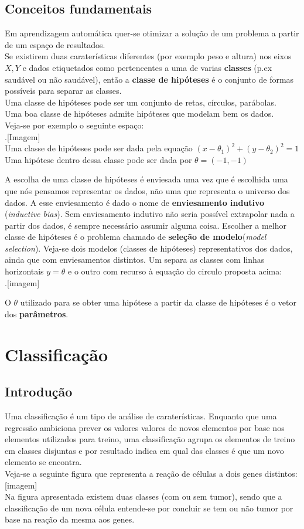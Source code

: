 \documentclass[]{report}
\begin{document}
\section{Conceitos fundamentais}
Em aprendizagem automática quer-se otimizar a solução de um problema a partir de um espaço de resultados.\\
Se existirem duas caraterísticas diferentes (por exemplo peso e altura) nos eixos $X,Y$ e dados etiquetados como pertencentes a uma de varias \textbf{classes} (p.ex saudável ou não saudável), então a \textbf{classe de hipóteses} é o conjunto de formas possíveis para separar as classes.\\
Uma classe de hipóteses pode ser um conjunto de retas, círculos, parábolas.\\
Uma boa classe de hipóteses admite hipóteses que modelam bem os dados.\\[0.2cm]
Veja-se por exemplo o seguinte espaço:\\
.[Imagem]\\[0.2cm]
Uma classe de hipóteses pode ser dada pela equação $(x-\theta_1)^2+(y-\theta_2)^2 = 1$\\
Uma hipótese dentro dessa classe pode ser dada por $\theta=(-1,-1)$\par
A escolha de uma classe de hipóteses é enviesada uma vez que é escolhida uma que nós pensamos representar os dados, não uma que representa o universo dos dados. A esse enviesamento é dado o nome de \textbf{enviesamento indutivo} (\textit{inductive bias}).
Sem enviesamento indutivo não seria possível extrapolar nada a partir dos dados, é sempre necessário assumir alguma coisa.
Escolher a melhor classe de hipóteses é o problema chamado de \textbf{seleção de modelo}(\textit{model selection}).
Veja-se dois modelos (classes de hipóteses) representativos dos dados, ainda que com enviesamentos distintos. Um separa as classes com linhas horizontais $y=\theta$ e o outro com recurso à equação do circulo proposta acima:\\
.[imagem]\par
O $\theta$ utilizado para se obter uma hipótese a partir da classe de hipóteses é o vetor dos \textbf{parâmetros}.
\chapter{Classificação}
\section{Introdução}
Uma classificação é um tipo de análise de caraterísticas. Enquanto que uma regressão ambiciona prever os valores valores de novos elementos por base nos elementos utilizados para treino, uma classificação agrupa os elementos de treino em classes disjuntas e por resultado indica em qual das classes é que um novo elemento se encontra.\\[0.2cm]
Veja-se a seguinte figura que representa a reação de células a dois genes distintos: [imagem]\\
Na figura apresentada existem duas classes (com ou sem tumor), sendo que a classificação de um nova célula entende-se por concluir se tem ou não tumor por base na reação da mesma aos genes.
\end{document}
